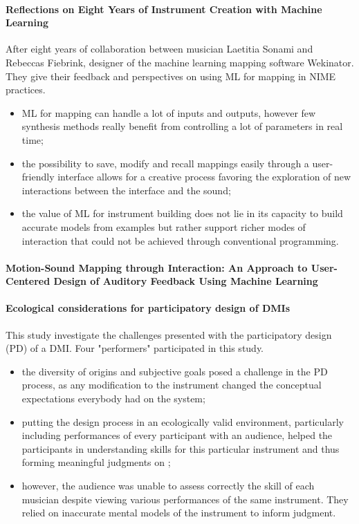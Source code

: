 \documentclass[11pt]{article}
\begin{document}
\paragraph{Reflections on Eight Years of Instrument Creation with Machine Learning} \citep{fiebrink_reflections_2020}

After eight years of collaboration between musician Laetitia Sonami and Rebeccas Fiebrink, designer of the machine learning mapping software Wekinator. They give their feedback and perspectives on using ML for mapping in NIME practices.
\begin{itemize}
    \item ML for mapping can handle a lot of inputs and outputs, however few synthesis methods really benefit from controlling a lot of parameters in real time;
    \item the possibility to save, modify and recall mappings easily through a user-friendly interface allows for a creative process favoring the exploration of new interactions between the interface and the sound;
    \item the value of ML for instrument building does not lie in its capacity to build accurate models from examples but rather support richer modes of interaction that could not be achieved through conventional programming.
\end{itemize}


\paragraph{Motion-Sound Mapping through Interaction: An Approach to User-Centered Design of Auditory Feedback Using Machine Learning} \citep{francoise_motion-sound_2018}


\paragraph{Ecological considerations for participatory design of DMIs} \citep{fyans_ecological_2012}

This study investigate the challenges presented with the participatory design (PD) of a DMI. Four "performers" participated in this study.
\begin{itemize}
    \item the diversity of origins and subjective goals posed a challenge in the PD process, as any modification to the instrument changed the conceptual expectations everybody had on the system;
    \item putting the design process in an ecologically valid environment, particularly including performances of every participant with an audience, helped the participants in understanding skills for this particular instrument and thus forming meaningful judgments on ;
    \item however, the audience was unable to assess correctly the skill of each musician despite viewing various performances of the same instrument. They relied on inaccurate mental models of the instrument to inform judgment. 
\end{itemize}
\end{document}
